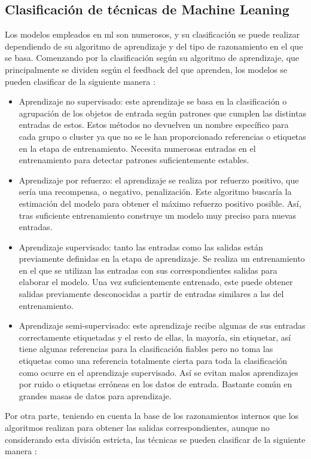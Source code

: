\subsection{Clasificación de técnicas de Machine Leaning}
\par Los modelos empleados en \gls{ml} son numerosos, y su clasificación se puede realizar dependiendo de su algoritmo de aprendizaje y del tipo de razonamiento en el que se basa. Comenzando por la clasificación según su algoritmo de aprendizaje, que principalmente se dividen según el feedback  del que aprenden, los modelos se pueden clasificar de la siguiente manera \cite{MLRussell}: 
\begin{itemize}
	\item Aprendizaje no supervisado: este aprendizaje se basa en la clasificación o agrupación de los objetos de entrada según patrones que cumplen las distintas entradas de estos. Estos métodos no devuelven un nombre específico para cada grupo o cluster ya que no se le han proporcionado referencias o etiquetas en la etapa de entrenamiento. Necesita numerosas entradas en el entrenamiento para detectar patrones suficientemente estables. 
	\item Aprendizaje por refuerzo: el aprendizaje se realiza por refuerzo positivo, que sería una recompensa, o negativo, penalización. Este algoritmo buscaría la estimación del modelo para obtener el máximo refuerzo positivo posible. Así, tras suficiente entrenamiento construye un modelo muy preciso para nuevas entradas. 
	\item Aprendizaje supervisado: tanto las entradas como las salidas están previamente definidas en la etapa de aprendizaje. Se realiza un entrenamiento en el que se utilizan las entradas con sus correspondientes salidas para elaborar el modelo. Una vez suficientemente entrenado, este puede obtener salidas previamente desconocidas a partir de entradas similares a las del entrenamiento. 
	\item Aprendizaje semi-supervisado: este aprendizaje recibe algunas de sus entradas correctamente etiquetadas y el resto de ellas, la mayoría, sin etiquetar, así tiene algunas referencias para la clasificación fiables pero no toma las etiquetas como una referencia totalmente cierta para toda la clasificación como ocurre en el aprendizaje supervisado. Así se evitan malos aprendizajes por ruido o etiquetas erróneas en los datos de entrada. Bastante común en grandes masas de datos para aprendizaje. 
\end{itemize}
\par Por otra parte, teniendo en cuenta la base de los razonamientos internos que los algoritmos realizan para obtener las salidas correspondientes, aunque no considerando esta división estricta, las técnicas se pueden clasificar de la siguiente manera \cite{MLFlach}:
